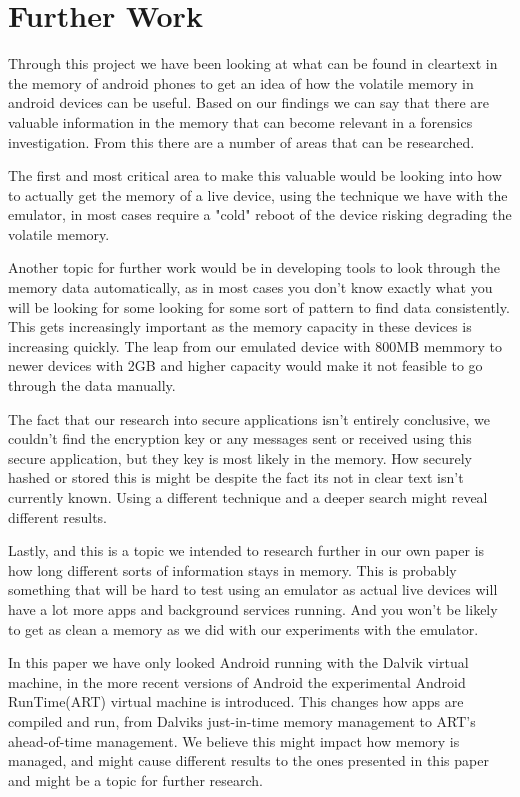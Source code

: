 \section{Further Work}
Through this project we have been looking at what can be found in cleartext in 
the memory of android phones to get an idea of how the volatile memory in 
android devices  can be useful. Based on our findings we can say that there are
valuable information in the memory that can become relevant in a forensics investigation. 
From this there are a number of areas that can be researched.

The first and most critical area to make this valuable would be looking into how 
to actually get the memory of a live device, using the technique we have with 
the emulator, in most cases require a "cold" reboot of the device risking degrading 
the volatile memory.

Another topic for further work would be in developing tools to look through the 
memory data automatically, as in most cases you don't know exactly what you will 
be looking for some looking for some sort of pattern to find data consistently. 
This gets increasingly important as the memory capacity in these devices is increasing 
quickly. The leap from our emulated device with 800MB memmory to newer devices 
with 2GB and higher capacity would make it not feasible to go through the data manually.

The fact that our research into secure applications isn't entirely conclusive, we
couldn't find the encryption  key or any messages sent or received using this 
secure application, but they key is most likely in the memory. How 
securely hashed or stored this is might be despite the fact its not in clear text 
isn't currently known. Using a different technique and a deeper search might 
reveal different results.

Lastly, and this is a topic we intended to research further in our own paper is 
how long different sorts of information stays in memory. This is probably 
something that will be hard to test using an emulator as actual live devices will 
have a lot more apps and background services running. And you won't be likely to 
get as clean a memory as we did with our experiments with the emulator. 

In this paper we have only looked Android running with the Dalvik virtual machine, 
in the more recent versions of Android the experimental Android RunTime(ART) 
virtual machine is introduced. This changes how apps are compiled and run, from 
Dalviks just-in-time memory management to ART’s ahead-of-time management. We 
believe this might impact how memory is managed, and might cause different 
results to the ones presented in this paper and might be a topic for further research. \\